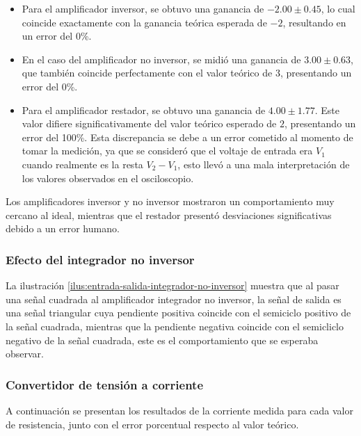 \begin{itemize}
    \item Para el amplificador inversor, se obtuvo una ganancia de $-2.00 \pm 0.45$, lo cual coincide exactamente con la ganancia teórica esperada de $-2$, resultando en un error del 0\%.
    
    \item En el caso del amplificador no inversor, se midió una ganancia de $3.00 \pm 0.63$, que también coincide perfectamente con el valor teórico de $3$, presentando un error del 0\%.
    
    \item Para el amplificador restador, se obtuvo una ganancia de $4.00 \pm 1.77$. Este valor difiere significativamente del valor teórico esperado de $2$, presentando un error del 100\%. Esta discrepancia se debe a un error cometido al momento de tomar la medición, ya que se consideró que el voltaje de entrada era $V_1$ cuando realmente es la resta $V_2 - V_1$, esto llevó a una mala interpretación de los valores observados en el osciloscopio.
\end{itemize}

Los amplificadores inversor y no inversor mostraron un comportamiento muy cercano al ideal, mientras que el restador presentó desviaciones significativas debido a un error humano.

\subsubsection{Efecto del integrador no inversor}

La ilustración \ref{ilus:entrada-salida-integrador-no-inversor} muestra que al pasar una señal cuadrada al amplificador integrador no inversor, la señal de salida es una señal triangular cuya pendiente positiva coincide con el semiciclo positivo de la señal cuadrada, mientras que la pendiente negativa coincide con el semicliclo negativo de la señal cuadrada, este es el comportamiento que se esperaba observar.

\subsubsection{Convertidor de tensión a corriente}

A continuación se presentan los resultados de la corriente medida para cada valor de resistencia, junto con el error porcentual respecto al valor teórico.

